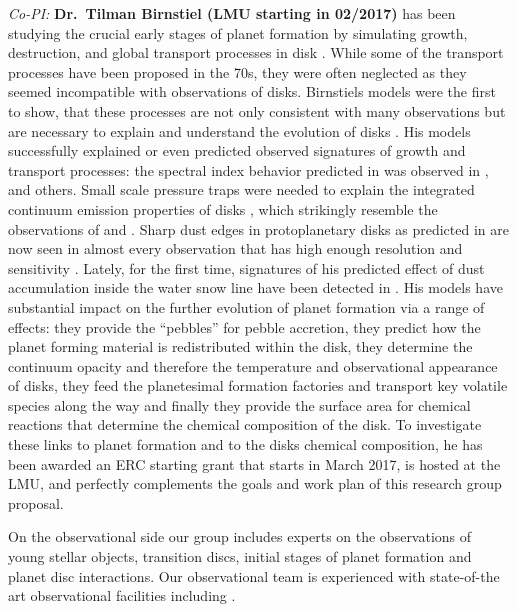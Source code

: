 \documentclass[10pt,fleqn,twoside]{article}
\begin{document}
\textit{Co-PI:} \textbf{Dr.\ Tilman Birnstiel (LMU starting in 02/2017)} has been
studying the crucial early stages of planet formation by simulating growth,
destruction, and global transport processes in disk
\citep[e.g.][]{2010A&A...513A..79B}. While some of the transport processes have
been proposed in the 70s, they were often neglected as they seemed incompatible
with observations of disks. Birnstiels models were the first to show, that these
processes are not only consistent with many observations but are necessary to
explain and understand the evolution of disks \citep{2010A&A...516L..14B}. His
models successfully explained or even predicted observed signatures of growth
and transport processes: the spectral index behavior predicted in
\citet{2010A&A...516L..14B} was observed in \citet{2012ApJ...760L..17P},
\citet{2016A&A...588A..53T} and others. Small scale pressure traps were needed
to explain the integrated continuum emission properties of disks
\citep{2012A&A...538A.114P}, which strikingly resemble the observations of
\citet{2015ApJ...808L...3A} and \citet{2016ApJ...820L..40A}. Sharp dust edges in
protoplanetary disks as predicted in \citet{2014ApJ...780..153B} are now seen in
almost every observation that has high enough resolution and sensitivity
\citep[e.g.][]{2016ApJ...820L..40A,2013A&A...557A.133D}. Lately, for the first
time, signatures of his predicted effect of dust accumulation inside the water
snow line \citet{2010A&A...513A..79B} have been detected in
\citet{2016Natur.535..258C}. His models have substantial impact on the further
evolution of planet formation via a range of effects: they provide the
``pebbles'' for pebble accretion, they predict how the planet forming material
is redistributed within the disk, they determine the continuum opacity and
therefore the temperature and observational appearance of disks, they feed the
planetesimal formation factories and transport key volatile species along the
way and finally they provide the surface area for chemical reactions that determine the
chemical composition of the disk. To investigate these links to planet formation
and to the disks chemical composition, he has been awarded an ERC starting grant
that starts in March 2017, is hosted at the LMU, and perfectly complements
the goals and work plan of this research group proposal.

 On the observational side our group includes experts on the
 observations of young stellar objects, transition discs, initial stages of
 planet formation and planet disc interactions. Our observational
 team is experienced with state-of-the art observational facilities
 including .\\
\end{document}
